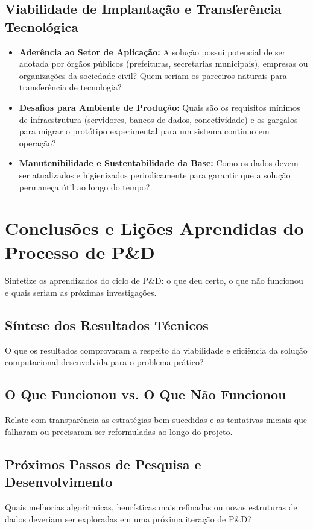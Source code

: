 \documentclass[11pt,a4paper]{article}
\begin{document}
\subsection{Viabilidade de Implantação e Transferência Tecnológica}
\begin{itemize}
    \item \textbf{Aderência ao Setor de Aplicação:} A solução possui potencial de ser adotada por órgãos públicos (prefeituras, secretarias municipais), empresas ou organizações da sociedade civil? Quem seriam os parceiros naturais para transferência de tecnologia?
    \item \textbf{Desafios para Ambiente de Produção:} Quais são os requisitos mínimos de infraestrutura (servidores, bancos de dados, conectividade) e os gargalos para migrar o protótipo experimental para um sistema contínuo em operação?
    \item \textbf{Manutenibilidade e Sustentabilidade da Base:} Como os dados devem ser atualizados e higienizados periodicamente para garantir que a solução permaneça útil ao longo do tempo?
\end{itemize}

\section{Conclusões e Lições Aprendidas do Processo de P\&D}

\begin{instrucao}
Sintetize os aprendizados do ciclo de P\&D: o que deu certo, o que não funcionou e quais seriam as próximas investigações.
\end{instrucao}

\subsection{Síntese dos Resultados Técnicos}
O que os resultados comprovaram a respeito da viabilidade e eficiência da solução computacional desenvolvida para o problema prático?

\subsection{O Que Funcionou vs. O Que Não Funcionou}
Relate com transparência as estratégias bem-sucedidas e as tentativas iniciais que falharam ou precisaram ser reformuladas ao longo do projeto.

\subsection{Próximos Passos de Pesquisa e Desenvolvimento}
Quais melhorias algorítmicas, heurísticas mais refinadas ou novas estruturas de dados deveriam ser exploradas em uma próxima iteração de P\&D?
\end{document}
